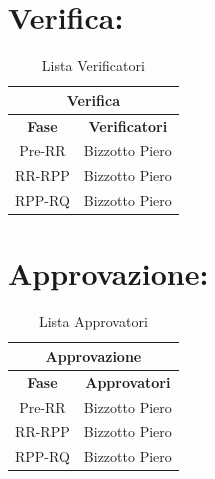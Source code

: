 \newpage
\section*{\LARGE Verifica:}
\begin{table}[!h]
	\begin{center}
		\begin{tabular}
			{|c|c|}
			\hline
			\multicolumn{2}{|c|}{ \textbf{Verifica}} \\
			\hline
			\textbf{Fase} & \textbf{Verificatori} \\
			\hline
			\multirow{1}{*}{Pre-RR}  &  Bizzotto Piero\\
			\hline
			\multirow{1}{*}{RR-RPP} & Bizzotto Piero\\
									
			\hline
			\multirow{1}{*}{RPP-RQ} & Bizzotto Piero\\
			\hline
		\end{tabular}
		\caption{Lista Verificatori} %
		\label{tabverifica}
	\end{center}
\end{table}

\section*{\LARGE Approvazione:}
\begin{table}[!h]
	\begin{center}
		\begin{tabular}
			{|c|c|}
			\hline
			\multicolumn{2}{|c|}{ \textbf{Approvazione} } \\
			\hline
			\textbf{Fase} & \textbf{Approvatori} \\
			\hline
			\multirow{1}{*}{Pre-RR}  &  Bizzotto Piero\\
			\hline
			\multirow{1}{*}{RR-RPP} & Bizzotto Piero\\
									
			\hline
			\multirow{1}{*}{RPP-RQ} & Bizzotto Piero\\
			\hline
		\end{tabular}
		\caption{Lista Approvatori} %
		\label{tabapprovazione}
	\end{center}
\end{table}

